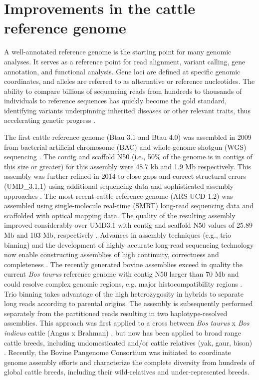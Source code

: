 \documentclass[../main.tex]{subfiles}
\begin{document}
\section{Improvements in the cattle reference genome} 

A well-annotated reference genome is the starting point for many genomic analyses. It serves as a reference point for read alignment, variant calling, gene annotation, and functional analysis. Gene loci are defined at specific genomic coordinates, and alleles are referred to as alternative or reference  nucleotides. The ability to compare billions of sequencing reads from hundreds to thousands of individuals to reference sequences has quickly become the gold standard, identifying variants underpinning  inherited diseases or other relevant traits, thus accelerating genetic progress \citep{bickhart2020symposium}.

The first cattle reference genome (Btau 3.1 and Btau 4.0) was assembled in 2009 from bacterial artificial chromosome (BAC) and whole-genome shotgun (WGS) sequencing \citep{elsik2009genome}. The contig and scaffold N50 (i.e., 50\% of the genome is in contigs of this size or greater) for this assembly were 48.7 kb and 1.9 Mb respectively. This assembly was further refined in 2014 to close gaps and correct structural errors (UMD\_3.1.1) using additional sequencing data and sophisticated assembly approaches \citep{zimin2009whole}. The most recent cattle reference genome (ARS-UCD 1.2) was assembled using single-molecule real-time (SMRT) long-read sequencing data and scaffolded with optical mapping data. The quality of the resulting assembly improved considerably over UMD3.1 with contig and scaffold N50 values of 25.89 Mb and 103 Mb, respectively \citep{rosen2020novo}. Advances in assembly techniques (e.g., trio binning) and the development of highly accurate long-read sequencing technology now enable constructing assemblies of high continuity, correctness and completeness \citep{bickhart2020symposium}. The recently generated bovine assemblies exceed in quality the current \emph{Bos taurus} reference genome with contig N50 larger than 70 Mb and could resolve complex genomic regions, e.g. major histocompatibility regions \citep{rice2020continuous}. Trio binning takes advantage of the high heterozygosity in hybrids to separate long reads according to parental origins. The assembly is subsequently performed separately from the partitioned reads resulting in two haplotype-resolved assemblies. This approach  was first applied  to a cross between \emph{Bos taurus} x \emph{Bos indicus} cattle (Angus x Brahman) \citep{koren2018novo}, but now has been applied to broad range cattle breeds, including  undomesticated and/or cattle relatives (yak, gaur, bison) \citep{oppenheimer2021reference}. Recently, the Bovine Pangenome Consortium \citep{heaton2021reference} was initiated to coordinate genome assembly efforts and characterize the complete diversity from hundreds of global cattle breeds, including their wild-relatives and under-represented breeds. 
\end{document}
